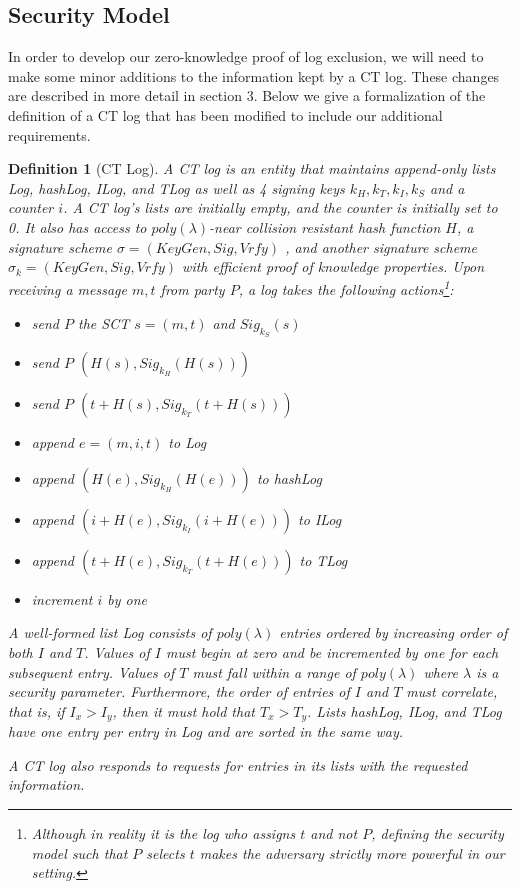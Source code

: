 \documentclass[letterpaper,twocolumn,10pt]{article}
\newtheorem{definition}[theorem]{Definition}
\begin{document}
\subsection{Security Model}
In order to develop our zero-knowledge proof of log exclusion, we will need to make some minor additions to the information kept by a CT log. These changes are described in more detail in section 3. Below we give a formalization of the definition of a CT log that has been modified to include our additional requirements. 
\begin{definition}[CT Log]
A CT log is an entity that maintains append-only lists Log, hashLog, ILog, and TLog as well as 4 signing keys $k_H, k_T, k_I, k_S$ and a counter $i$. A CT log's lists are initially empty, and the counter is initially set to 0. It also has access to $poly(\lambda)$-near collision resistant hash function $H$, a signature scheme $\sigma=(KeyGen, Sig, Vrfy)$ , and another signature scheme $\sigma_k = (KeyGen, Sig, Vrfy)$ with efficient proof of knowledge properties. Upon receiving a message $m, t$ from party $P$, a log takes the following actions\footnote{Although in reality it is the log who assigns $t$ and not $P$, defining the security model such that $P$ selects $t$ makes the adversary strictly more powerful in our setting.}:
\begin{itemize}
\item send $P$ the SCT $s=(m, t)$ and $Sig_{k_S}(s)$
\item send $P$ $(H(s), Sig_{k_H}(H(s)))$
\item send $P$ $(t+H(s), Sig_{k_T}(t+H(s)))$
\item append $e = (m, i, t)$ to Log
\item append $(H(e), Sig_{k_H}(H(e)))$ to hashLog
\item append $(i+H(e), Sig_{k_I}(i+H(e)))$ to ILog
\item append $(t+H(e), Sig_{k_T}(t+H(e)))$ to TLog
\item increment $i$ by one
\end{itemize}

A well-formed list Log consists of $poly(\lambda)$ entries ordered by increasing order of both $I$ and $T$. Values of $I$ must begin at zero and be incremented by one for each subsequent entry. Values of $T$ must fall within a range of $poly(\lambda)$ where $\lambda$ is a security parameter. Furthermore, the order of entries of $I$ and $T$ must correlate, that is, if $I_x>I_y$, then it must hold that $T_x>T_y$. Lists hashLog, ILog, and TLog have one entry per entry in Log and are sorted in the same way.

A CT log also responds to requests for entries in its lists with the requested information.
\end{definition}
\end{document}
